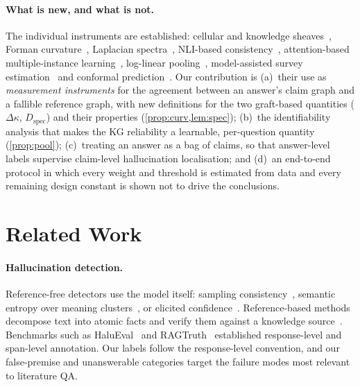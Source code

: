 \documentclass[10pt,twocolumn]{article}
\theoremstyle{remark}
\begin{document}
\paragraph{What is new, and what is not.}
The individual instruments are established: cellular and knowledge sheaves~\cite{hansen2019sheaves,gebhart2023knowledge},
Forman curvature~\cite{forman2003bochner,samal2018comparative}, Laplacian spectra~\cite{chung1997spectral}, NLI-based
consistency~\cite{laban2022summac}, attention-based multiple-instance learning~\cite{ilse2018attention}, log-linear
pooling~\cite{genest1986combining}, model-assisted survey estimation~\cite{sarndal1992model} and conformal
prediction~\cite{vovk2005algorithmic,vovk2012conditional}. Our contribution is (a)~their use as \emph{measurement
instruments} for the agreement between an answer's claim graph and a fallible reference graph, with new definitions
for the two graft-based quantities ($\Delta\kappa$, $D_{\mathrm{spec}}$) and their properties
(\cref{prop:curv,lem:spec}); (b)~the identifiability analysis that makes the KG reliability a learnable,
per-question quantity (\cref{prop:pool}); (c)~treating an answer as a bag of claims, so that answer-level labels
supervise claim-level hallucination localisation; and (d)~an end-to-end protocol in which every weight and threshold
is estimated from data and every remaining design constant is shown not to drive the conclusions.

\section{Related Work}
\label{sec:related}

\paragraph{Hallucination detection.}
Reference-free detectors use the model itself: sampling consistency~\cite{manakul2023selfcheckgpt}, semantic
entropy over meaning clusters~\cite{farquhar2024semantic}, or elicited confidence~\cite{kadavath2022know,xiong2024uncertainty}.
Reference-based methods decompose text into atomic facts and verify them against a knowledge
source~\cite{min2023factscore}. Benchmarks such as HaluEval~\cite{li2023halueval} and RAGTruth~\cite{niu2024ragtruth}
established response-level and span-level annotation. Our labels follow the response-level convention, and our
false-premise and unanswerable categories target the failure modes most relevant to literature QA.
\end{document}
